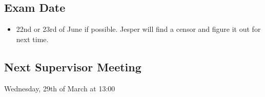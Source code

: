 \subsection{Exam Date}
\begin{itemize}
    \item 22nd or 23rd of June if possible. Jesper will find a censor and figure it out for next time.
\end{itemize}
\subsection{Next Supervisor Meeting}
Wednesday, 29th of March at 13:00

